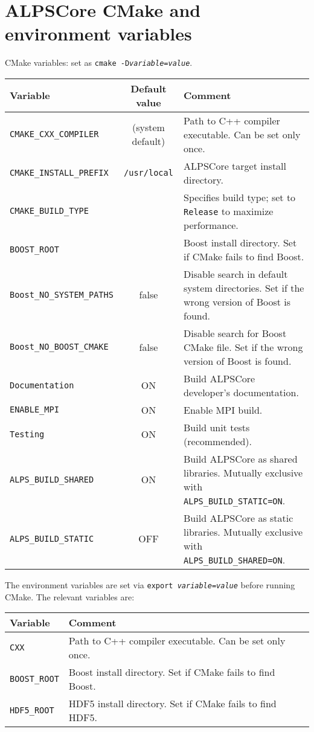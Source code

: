 \documentclass[12pt]{article}
\newcommand{\code}[1]{\texttt{#1}}
\begin{document}
\pagebreak
\section{ALPSCore CMake and environment variables}
CMake variables: set as \code{cmake
  -D\textit{variable}=\textit{value}}.

{\small
\begin{tabularx}{\textwidth}{lcX}
  \textbf{Variable} & \textbf{Default value} & {\hfil\textbf{Comment}\hfil}\\
  \toprule
  \code{CMAKE\_CXX\_COMPILER} & (system default) & {Path to C++ compiler executable.
    Can be set only once.} \\\midrule
  \code{CMAKE\_INSTALL\_PREFIX} & \code{/usr/local} & ALPSCore target install directory. \\\midrule
  \code{CMAKE\_BUILD\_TYPE} &  &  {Specifies build type;
    set to \code{Release} to maximize performance.} \\\midrule
  \code{BOOST\_ROOT} &   & {Boost install directory.
    Set if CMake fails to find Boost.} \\\midrule
  \code{Boost\_NO\_SYSTEM\_PATHS} & false & {Disable search in default system directories.
    Set if the wrong version of Boost is found.} \\\midrule
  \code{Boost\_NO\_BOOST\_CMAKE} & false & {Disable search for Boost CMake file.
    Set if the wrong version of Boost is found.} \\\midrule
  \code{Documentation} & ON & Build ALPSCore developer's documentation. \\\midrule
  \code{ENABLE\_MPI} & ON & Enable MPI build. \\\midrule
  \code{Testing} & ON & Build unit tests (recommended). \\\midrule
  \code{ALPS\_BUILD\_SHARED} & ON & {Build ALPSCore as shared libraries.
    Mutually exclusive with \code{ALPS\_BUILD\_STATIC=ON}.} \\\midrule
  \code{ALPS\_BUILD\_STATIC} & OFF & {Build ALPSCore as static libraries.
    Mutually exclusive with \code{ALPS\_BUILD\_SHARED=ON}.} \\
  \bottomrule
\end{tabularx}
}

\newpage
The environment variables are set via \code{export
  \textit{variable}=\textit{value}} before running CMake. The relevant
variables are:

{\small
  \begin{tabularx}{1\textwidth}{l@{\hspace{5em}}X}
    \textbf{Variable} & {\hfil\textbf{Comment}\hfil}\\
    \toprule
    \code{CXX} &  Path to C++ compiler executable.
                 Can be set only once. \\\midrule
    \code{BOOST\_ROOT} &  Boost install directory.
                        Set if CMake fails to find Boost. \\\midrule
    \code{HDF5\_ROOT}  &  HDF5 install directory.
                        Set if CMake fails to find HDF5.\\

    \bottomrule
  \end{tabularx}
}
\end{document}
